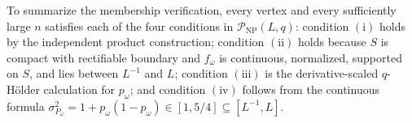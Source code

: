 To summarize the membership verification, every vertex and every sufficiently large \(n\) satisfies each of the four conditions in \(\mathcal P_{\mathrm{NP}}(L,q)\): condition \(\mathrm{(i)}\) holds by the independent product construction; condition \(\mathrm{(ii)}\) holds because \(S\) is compact with rectifiable boundary and \(f_\omega\) is continuous, normalized, supported on \(S\), and lies between \(L^{-1}\) and \(L\); condition \(\mathrm{(iii)}\) is the derivative-scaled \(q\)-H\"older calculation for \(p_\omega\); and condition \(\mathrm{(iv)}\) follows from the continuous formula \(\sigma^2_{P_\omega}=1+p_\omega(1-p_\omega)\in[1,5/4]\subseteq[L^{-1},L]\).